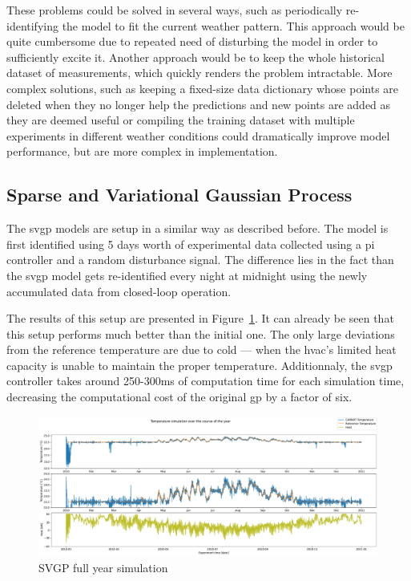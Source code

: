 These problems could be solved in several ways, such as periodically
re-identifying the model to fit the current weather pattern. This approach would
be quite cumbersome due to repeated need of disturbing the model in order to
sufficiently excite it. Another approach would be to keep the whole historical
dataset of measurements, which quickly renders the problem intractable. More
complex solutions, such as keeping a fixed-size data dictionary whose points are
deleted when they no longer help the predictions and new points are added as
they are deemed useful or compiling the training dataset with multiple
experiments in different weather conditions could dramatically improve model
performance, but are more complex in implementation.


\subsection{Sparse and Variational Gaussian Process}\label{sec:SVGP_results}

The \acrlong{svgp} models are setup in a similar way as described before. The
model is first identified using 5 days worth of experimental data collected
using a \acrshort{pi} controller and a random disturbance signal. The difference
lies in the fact than the \acrshort{svgp} model gets re-identified every night
at midnight using the newly accumulated data from closed-loop operation.

The results of this setup are presented in
Figure~\ref{fig:SVGP_fullyear_simulation}. It can already be seen that this
setup performs much better than the initial one. The only large deviations from
the reference temperature are due to cold --- when the \acrshort{hvac}'s limited
heat capacity is unable to maintain the proper temperature. Additionnaly, the
\acrshort{svgp} controller takes around 250-300ms of computation time for each
simulation time, decreasing the computational cost of the original \acrshort{gp}
by a factor of six.



\begin{figure}[ht]
    \centering
    \includegraphics[width =
    \textwidth]{Plots/1_SVGP_480pts_inf_window_12_averageYear_fullyear.pdf}
    \caption{SVGP full year simulation}
    \label{fig:SVGP_fullyear_simulation}
\end{figure}

